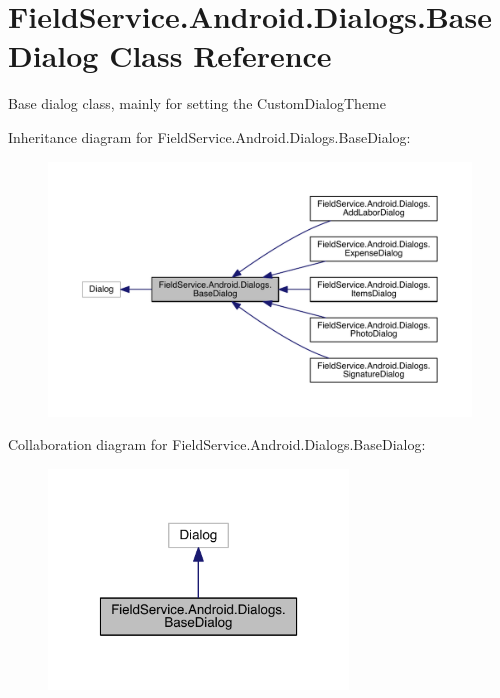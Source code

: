 \hypertarget{class_field_service_1_1_android_1_1_dialogs_1_1_base_dialog}{\section{Field\+Service.\+Android.\+Dialogs.\+Base\+Dialog Class Reference}
\label{class_field_service_1_1_android_1_1_dialogs_1_1_base_dialog}
}


Base dialog class, mainly for setting the Custom\+Dialog\+Theme  




Inheritance diagram for Field\+Service.\+Android.\+Dialogs.\+Base\+Dialog\+:
\nopagebreak
\begin{figure}[H]
\begin{center}
\leavevmode
\includegraphics[width=350pt]{class_field_service_1_1_android_1_1_dialogs_1_1_base_dialog__inherit__graph}
\end{center}
\end{figure}


Collaboration diagram for Field\+Service.\+Android.\+Dialogs.\+Base\+Dialog\+:
\nopagebreak
\begin{figure}[H]
\begin{center}
\leavevmode
\includegraphics[width=226pt]{class_field_service_1_1_android_1_1_dialogs_1_1_base_dialog__coll__graph}
\end{center}
\end{figure}
